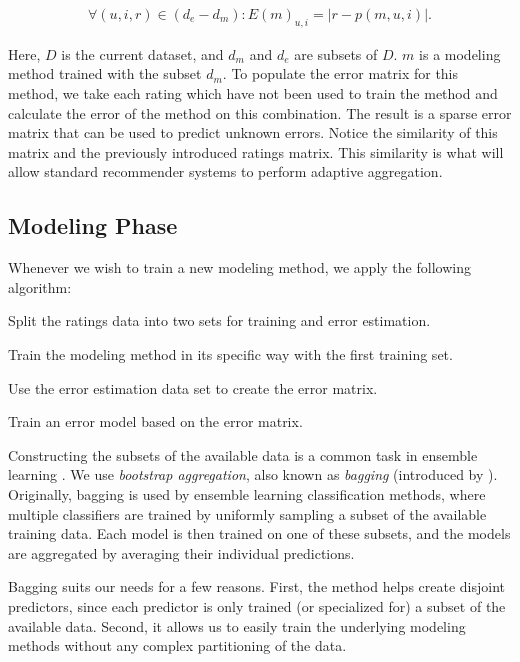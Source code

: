 \begin{eqnarray*}
  \forall (u,i,r) \in (d_e - d_m): E(m)_{u,i} = |r - p(m,u,i)|.
\end{eqnarray*}

Here, $D$ is the current dataset, and
$d_m$ and $d_e$ are subsets of $D$.
$m$ is a modeling method trained with the subset $d_m$.
To populate the error matrix for this method,
we take each rating which have not been used to train the method
and calculate the error of the method on this combination.
The result is a sparse error matrix
that can be used to predict unknown errors.
Notice the similarity of this matrix and the previously introduced ratings matrix.
This similarity is what will allow standard recommender systems
to perform adaptive aggregation.


\subsection{Modeling Phase}

Whenever we wish to train a new modeling method,
we apply the following algorithm:

\begin{enumerate*}
  \item Split the ratings data into two sets for training and error estimation.
  \item Train the modeling method in its specific way with the first training set.
  \item Use the error estimation data set to create the error matrix.
  \item Train an error model based on the error matrix.
\end{enumerate*}

Constructing the subsets of the available data is a common task in ensemble learning
\cite[p7]{Polikar2006}.
We use \emph{bootstrap aggregation}, also known as \emph{bagging} (introduced by \cite{Breiman1996}).
Originally, bagging is used by ensemble learning classification methods, where multiple classifiers are 
trained by uniformly sampling a subset of the available training data. 
Each model is then trained on one of these subsets, and the models are aggregated by averaging their individual predictions.

Bagging suits our needs for a few reasons.
First, the method helps create disjoint predictors, 
since each predictor is only trained (or specialized for) a subset of the available data.
Second, it allows us to easily train the underlying modeling methods without any complex partitioning of the data.

